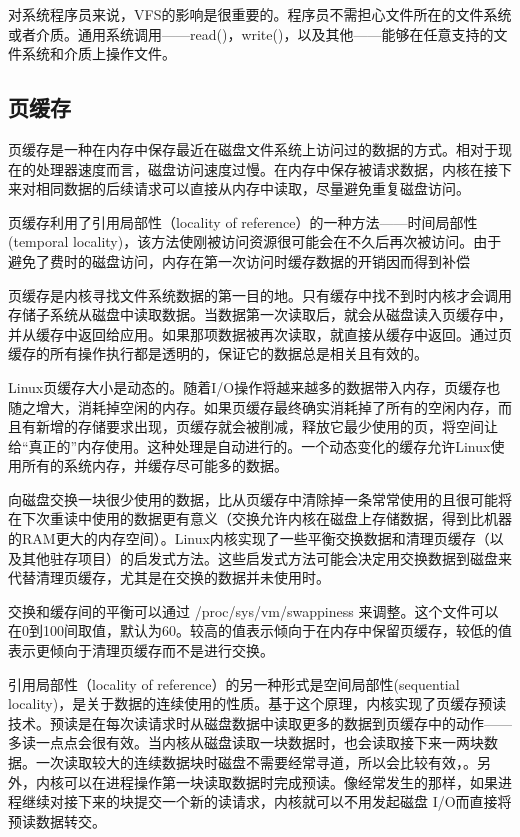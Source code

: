 对系统程序员来说，VFS的影响是很重要的。程序员不需担心文件所在的文件系统或者介质。通用系统调用——read()，write()，以及其他——能够在任意支持的文件系统和介质上操作文件。 

\subsection{页缓存}

页缓存是一种在内存中保存最近在磁盘文件系统上访问过的数据的方式。相对于现在的处理器速度而言，磁盘访问速度过慢。在内存中保存被请求数据，内核在接下来对相同数据的后续请求可以直接从内存中读取，尽量避免重复磁盘访问。

页缓存利用了引用局部性（locality of reference）的一种方法——时间局部性(temporal locality)，该方法使刚被访问资源很可能会在不久后再次被访问。由于避免了费时的磁盘访问，内存在第一次访问时缓存数据的开销因而得到补偿

页缓存是内核寻找文件系统数据的第一目的地。只有缓存中找不到时内核才会调用存储子系统从磁盘中读取数据。当数据第一次读取后，就会从磁盘读入页缓存中，并从缓存中返回给应用。如果那项数据被再次读取，就直接从缓存中返回。通过页缓存的所有操作执行都是透明的，保证它的数据总是相关且有效的。

Linux页缓存大小是动态的。随着I/O操作将越来越多的数据带入内存，页缓存也随之增大，消耗掉空闲的内存。如果页缓存最终确实消耗掉了所有的空闲内存，而且有新增的存储要求出现，页缓存就会被削减，释放它最少使用的页，将空间让给“真正的”内存使用。这种处理是自动进行的。一个动态变化的缓存允许Linux使用所有的系统内存，并缓存尽可能多的数据。

向磁盘交换一块很少使用的数据，比从页缓存中清除掉一条常常使用的且很可能将在下次重读中使用的数据更有意义（交换允许内核在磁盘上存储数据，得到比机器的RAM更大的内存空间）。Linux内核实现了一些平衡交换数据和清理页缓存（以及其他驻存项目）的启发式方法。这些启发式方法可能会决定用交换数据到磁盘来代替清理页缓存，尤其是在交换的数据并未使用时。

交换和缓存间的平衡可以通过 /proc/sys/vm/swappiness 来调整。这个文件可以在0到100间取值，默认为60。较高的值表示倾向于在内存中保留页缓存，较低的值表示更倾向于清理页缓存而不是进行交换。

引用局部性（locality of reference）的另一种形式是空间局部性(sequential locality)，是关于数据的连续使用的性质。基于这个原理，内核实现了页缓存预读技术。预读是在每次读请求时从磁盘数据中读取更多的数据到页缓存中的动作——多读一点点会很有效。当内核从磁盘读取一块数据时，也会读取接下来一两块数据。一次读取较大的连续数据块时磁盘不需要经常寻道，所以会比较有效，。另外，内核可以在进程操作第一块读取数据时完成预读。像经常发生的那样，如果进程继续对接下来的块提交一个新的读请求，内核就可以不用发起磁盘 I/O而直接将预读数据转交。

